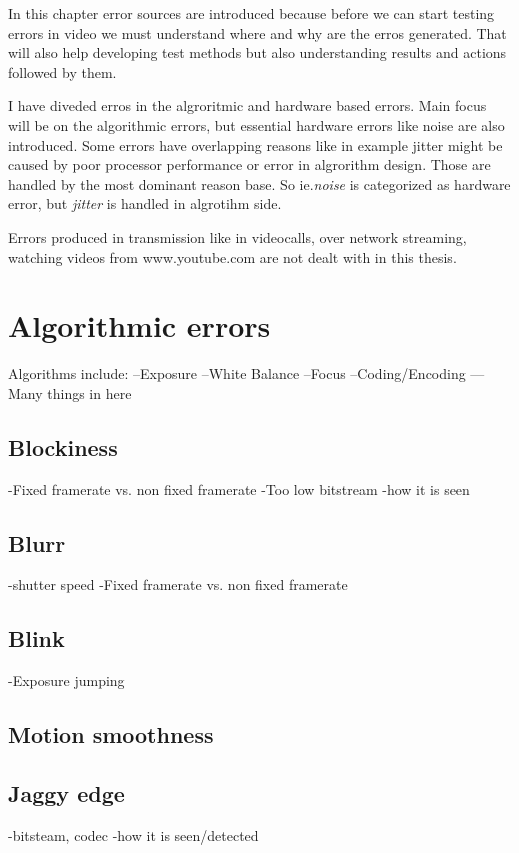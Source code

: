 


In this chapter error sources are introduced because before we can start
testing errors in video we must understand where and why are the
erros generated. That will also help developing test methods but also
understanding results and actions followed by them. 

I have diveded erros in the algroritmic and hardware based
errors. Main focus will be on the algorithmic errors, but essential hardware 
errors like noise are also introduced. Some
errors have overlapping reasons like in example jitter might be caused by
poor processor performance or error in algrorithm design. Those are handled
by the most dominant reason base. So ie.\textit{noise} is categorized as hardware
error, but \textit{jitter} is handled in algrotihm side.  

Errors produced in transmission like in videocalls, over network streaming,
watching videos from www.youtube.com are not dealt with in this thesis. 




\section{Algorithmic errors}
Algorithms include:
--Exposure
--White Balance
--Focus
--Coding/Encoding
---Many things in here

\subsection{Blockiness}
-Fixed framerate vs. non fixed framerate
-Too low bitstream
-how it is seen

\subsection{Blurr}
-shutter speed
-Fixed framerate vs. non fixed framerate


\subsection{Blink}
-Exposure jumping


\subsection{Motion smoothness}

\subsection{Jaggy edge}
-bitsteam, codec
-how it is seen/detected

